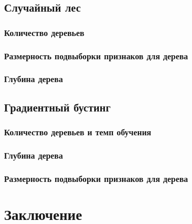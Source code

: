 \documentclass[12pt]{article}
\begin{document}
\subsection{Случайный лес}
\subsubsection{Количество деревьев}
\subsubsection{Размерность подвыборки признаков для дерева}
\subsubsection{Глубина дерева}

\subsection{Градиентный бустинг}
\subsubsection{Количество деревьев и темп обучения}
\subsubsection{Глубина дерева}
\subsubsection{Размерность подвыборки признаков для дерева}
\section{Заключение}
\end{document}
